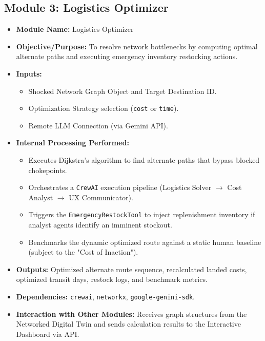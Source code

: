 \subsection[Module 3: Logistics Optimizer]{Module 3: Logistics Optimizer}
\begin{itemize}
    \item \textbf{Module Name:} Logistics Optimizer
    \item \textbf{Objective/Purpose:} To resolve network bottlenecks by computing optimal alternate paths and executing emergency inventory restocking actions.
    \item \textbf{Inputs:}
    \begin{itemize}
        \item Shocked Network Graph Object and Target Destination ID.
        \item Optimization Strategy selection (\texttt{cost} or \texttt{time}).
        \item Remote LLM Connection (via Gemini API).
    \end{itemize}
    \item \textbf{Internal Processing Performed:}
    \begin{itemize}
        \item Executes Dijkstra's algorithm to find alternate paths that bypass blocked chokepoints.
        \item Orchestrates a \texttt{CrewAI} execution pipeline (Logistics Solver $\rightarrow$ Cost Analyst $\rightarrow$ UX Communicator).
        \item Triggers the \texttt{EmergencyRestockTool} to inject replenishment inventory if analyst agents identify an imminent stockout.
        \item Benchmarks the dynamic optimized route against a static human baseline (subject to the "Cost of Inaction").
    \end{itemize}
    \item \textbf{Outputs:} Optimized alternate route sequence, recalculated landed costs, optimized transit days, restock logs, and benchmark metrics.
    \item \textbf{Dependencies:} \texttt{crewai}, \texttt{networkx}, \texttt{google-genini-sdk}.
    \item \textbf{Interaction with Other Modules:} Receives graph structures from the Networked Digital Twin and sends calculation results to the Interactive Dashboard via API.
\end{itemize}

